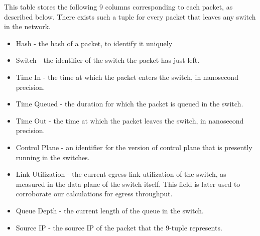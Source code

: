 This table stores the following 9 columns corresponding to each packet,
as described below. There exists such a tuple for every packet that leaves any switch in the network.
\begin{itemize}
	\item Hash - the hash of a packet, to identify it uniquely
	\item Switch - the identifier of the switch the packet has just left.
	\item Time In - the time at which the packet enters the switch, in nanosecond precision.
	\item Time Queued - the duration for which the packet is queued in the switch.
	\item Time Out - the time at which the packet leaves the switch, in nanosecond precision.
	\item Control Plane - an identifier for the version of control plane that is presently running in the switches.
	\item Link Utilization - the current egress link utilization of the switch, as measured in the data plane of the switch itself.
	This field is later used to corroborate our calculations for egress throughput.
	\item Queue Depth - the current length of the queue in the switch.
	\item Source IP - the source IP of the packet that the 9-tuple represents.
\end{itemize}